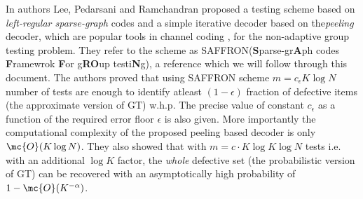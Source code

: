 \documentclass[conference,twocolumn]{IEEEtran}
\begin{document}
In \cite{lee2015saffron} authors Lee, Pedarsani and Ramchandran proposed a testing scheme based on \textit{left-regular sparse-graph} codes and a simple iterative decoder based on the\textit{peeling} decoder, which are popular tools in channel coding \cite{richardson2008modern}, for the non-adaptive group testing problem. They refer to the scheme as SAFFRON(\textbf{S}parse-gr\textbf{A}ph codes \textbf{F}ramewrok \textbf{F}or g\textbf{RO}up testi\textbf{N}g), a reference which we will follow through this document. The authors proved that using SAFFRON scheme $m=c_\epsilon K\log N$ number of tests are enough to identify atleast $(1-\epsilon)$ fraction of defective items (the approximate version of GT) w.h.p. The precise value of constant $c_\epsilon$ as a function of the required error floor $\epsilon$ is also given. More importantly the computational complexity of the proposed peeling based decoder is only $\mc{O}(K\log N)$. They also showed that with $m=c\cdot K\log K \log N$ tests  i.e. with an additional $\log K$ factor, the \textit{whole} defective set (the probabilistic version of GT) can be recovered with an asymptotically high probability of $1-\mc{O}(K^{-\alpha})$.
\end{document}
